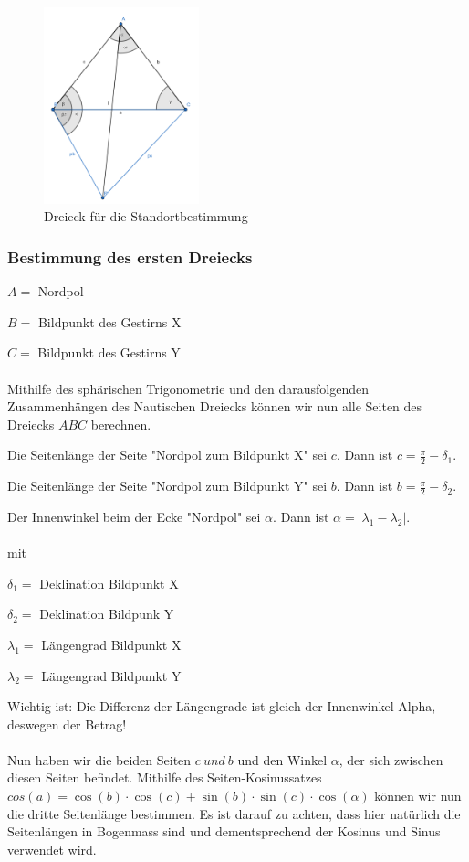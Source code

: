 \begin{figure}[h]
	\begin{center}
		\includegraphics[width=4.5cm]{papers/nav/bilder/dreieck.png}
		\caption[Dreieck für die Standortbestimmung]{Dreieck für die Standortbestimmung}
	\end{center}
\end{figure}


\subsubsection{Bestimmung des ersten Dreiecks}

$A=$ Nordpol

$B=$ Bildpunkt des Gestirns X

$C=$ Bildpunkt des Gestirns Y
\\
\\
Mithilfe des sphärischen Trigonometrie und den darausfolgenden Zusammenhängen des Nautischen Dreiecks können wir nun alle Seiten des Dreiecks $ABC$ berechnen.

Die Seitenlänge der Seite "Nordpol zum Bildpunkt X" sei $c$. 
Dann ist $c = \frac{\pi}{2} - \delta_1$. 

Die Seitenlänge der Seite "Nordpol zum Bildpunkt Y" sei $b$.
Dann ist $b = \frac{\pi}{2} - \delta_2$. 

Der Innenwinkel beim der Ecke "Nordpol" sei $\alpha$.
Dann ist $ \alpha = |\lambda_1 - \lambda_2|$. 
\\
\\
mit 

$\delta_1 =$ Deklination Bildpunkt X

$\delta_2 =$ Deklination Bildpunk Y

$\lambda_1 =$ Längengrad Bildpunkt X

$\lambda_2 =$ Längengrad Bildpunkt Y

Wichtig ist: Die Differenz der Längengrade ist gleich der Innenwinkel Alpha, deswegen der Betrag!
\\
\\
Nun haben wir die beiden Seiten $c\ und\ b$ und den Winkel $\alpha$, der sich zwischen diesen Seiten befindet. 
Mithilfe des Seiten-Kosinussatzes 
$cos(a) = \cos(b)\cdot \cos(c) + \sin(b) \cdot \sin(c)\cdot \cos(\alpha)$ 
können wir nun die dritte Seitenlänge bestimmen. 
Es ist darauf zu achten, dass hier natürlich die Seitenlängen in Bogenmass sind und dementsprechend der Kosinus und Sinus verwendet wird. 

